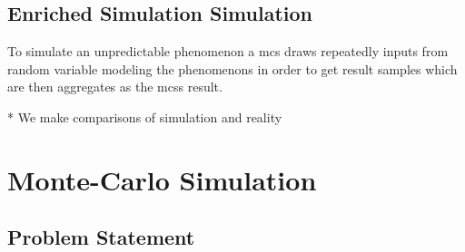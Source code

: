 \documentclass[10pt,conference,compsocconf]{IEEEtran}
\begin{document}
\subsection{Enriched Simulation Simulation}



To simulate an unpredictable phenomenon a \ac{mcs} draws repeatedly inputs from
random variable modeling the phenomenons in order to get result samples which
are then aggregates as the \acp{mcs} result. 

* We make comparisons of simulation and reality

%


\section{Monte-Carlo Simulation}



\subsection{Problem Statement}
\end{document}
